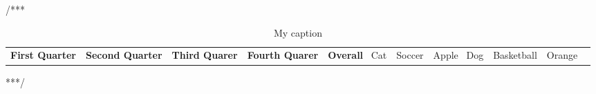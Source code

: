 /*** \begin{table}[] \centering \caption{My caption} \label{my-label} \begin{tabular}{|l|l|l|} \hline \textbf{First Quarter} & \textbf{Second Quarter} & \textbf{Third Quarer} & \textbf{Fourth Quarer} & \textbf{Overall }\ \hline Cat & Soccer & Apple \ \hline Dog & Basketball & Orange \ \hline \end{tabular} \end{table} ***/
